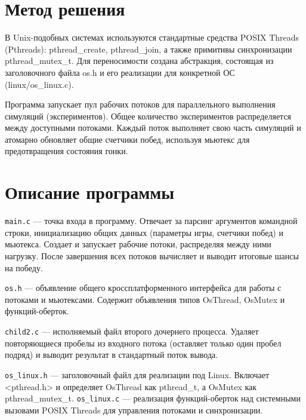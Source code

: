 \section{Метод решения}
В Unix-подобных системах используются стандартные средства POSIX Threads (Pthreads): pthread\_create, pthread\_join, а также примитивы синхронизации pthread\_mutex\_t. Для переносимости создана абстракция, состоящая из заголовочного файла os.h и его реализации для конкретной ОС (linux/os\_linux.c).

Программа запускает пул рабочих потоков для параллельного выполнения симуляций (экспериментов). Общее количество экспериментов распределяется между доступными потоками. Каждый поток выполняет свою часть симуляций и атомарно обновляет общие счетчики побед, используя мьютекс для предотвращения состояния гонки.

\section{Описание программы}

\texttt{main.c} --- точка входа в программу. Отвечает за парсинг аргументов командной строки, инициализацию общих данных (параметры игры, счетчики побед) и мьютекса. Создает и запускает рабочие потоки, распределяя между ними нагрузку. После завершения всех потоков вычисляет и выводит итоговые шансы на победу.

\texttt{os.h} --- объявление общего кроссплатформенного интерфейса для работы с потоками и мьютексами. Содержит объявления типов OsThread, OsMutex и функций-оберток.

\texttt{child2.c} --- исполняемый файл второго дочернего процесса. Удаляет повторяющиеся пробелы из входного потока (оставляет только один пробел подряд) и выводит результат в стандартный поток вывода.

\texttt{os\_linux.h} --- заголовочный файл для реализации под Linux. Включает <pthread.h> и определяет OsThread как pthread\_t, а OsMutex как pthread\_mutex\_t.  
\texttt{os\_linux.c} --- реализация функций-оберток над системными вызовами POSIX Threads для управления потоками и синхронизации. 

